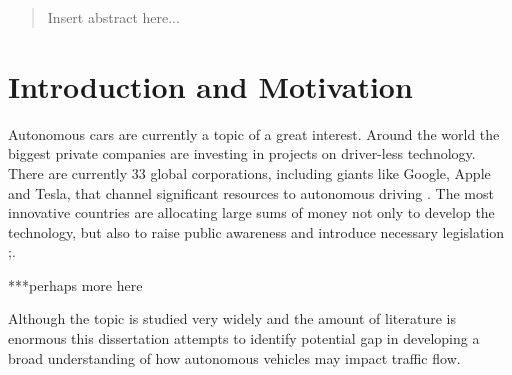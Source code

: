 \documentclass[11pt,english]{article}
\begin{document}





\begin{abstract}
Insert abstract here...
\end{abstract}


\newpage


\tableofcontents %

\newpage %



\section{Introduction and Motivation} %

\par
Autonomous cars are currently a topic of a great interest.  Around the world the biggest private companies are investing in projects on driver-less technology. There are currently 33 global corporations, including giants like Google, Apple and Tesla, that channel significant resources to autonomous driving \citep{33comp}. The most innovative countries are allocating large sums of money not only to develop the technology, but also to raise public awareness and introduce necessary legislation \citep{pathwaytodriverless};\citep{pathwaytodriverless2}. 

\par
***perhaps more here
\par
Although the topic is studied very widely and the amount of literature is enormous this dissertation attempts to identify potential gap in developing a broad understanding of how autonomous vehicles may impact traffic flow. 
\end{document}
